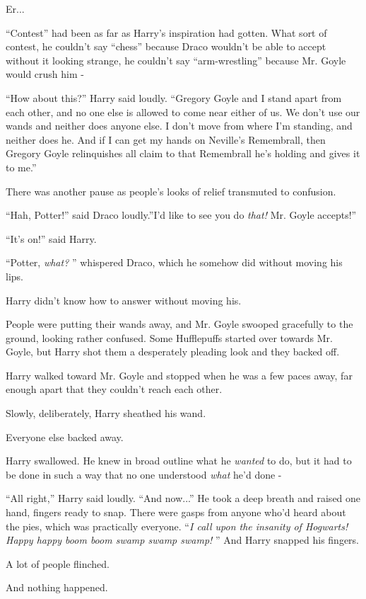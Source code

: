 Er...

``Contest'' had been as far as Harry's inspiration had gotten. What sort
of contest, he couldn't say ``chess'' because Draco wouldn't be able to
accept without it looking strange, he couldn't say ``arm-wrestling''
because Mr. Goyle would crush him -

``How about this?'' Harry said loudly. ``Gregory Goyle and I stand apart
from each other, and no one else is allowed to come near either of us.
We don't use our wands and neither does anyone else. I don't move from
where I'm standing, and neither does he. And if I can get my hands on
Neville's Remembrall, then Gregory Goyle relinquishes all claim to that
Remembrall he's holding and gives it to me.''

There was another pause as people's looks of relief transmuted to
confusion.

``Hah, Potter!'' said Draco loudly.''I'd like to see you do \emph{that!}
Mr. Goyle accepts!''

``It's on!'' said Harry.

``Potter, \emph{what?} '' whispered Draco, which he somehow did without
moving his lips.

Harry didn't know how to answer without moving his.

People were putting their wands away, and Mr. Goyle swooped gracefully
to the ground, looking rather confused. Some Hufflepuffs started over
towards Mr. Goyle, but Harry shot them a desperately pleading look and
they backed off.

Harry walked toward Mr. Goyle and stopped when he was a few paces away,
far enough apart that they couldn't reach each other.

Slowly, deliberately, Harry sheathed his wand.

Everyone else backed away.

Harry swallowed. He knew in broad outline what he \emph{wanted} to do,
but it had to be done in such a way that no one understood \emph{what}
he'd done -

``All right,'' Harry said loudly. ``And now...'' He took a deep
breath and raised one hand, fingers ready to snap. There were gasps from
anyone who'd heard about the pies, which was practically everyone.
``\emph{I call upon the insanity of Hogwarts! Happy happy boom boom swamp
swamp swamp!} '' And Harry snapped his fingers.

A lot of people flinched.

And nothing happened.

